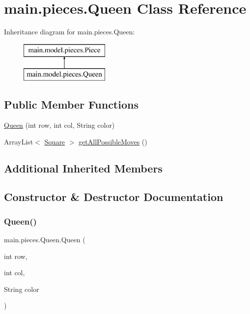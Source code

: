\hypertarget{classmain_1_1pieces_1_1_queen}{}\section{main.\+pieces.\+Queen Class Reference}
\label{classmain_1_1pieces_1_1_queen}
Inheritance diagram for main.\+pieces.\+Queen\+:\begin{figure}[H]
\begin{center}
\leavevmode
\includegraphics[height=2.000000cm]{classmain_1_1pieces_1_1_queen}
\end{center}
\end{figure}
\subsection*{Public Member Functions}
\begin{DoxyCompactItemize}
\item 
\hyperlink{classmain_1_1pieces_1_1_queen_a69aff226c807eec96b59970a1ef4b8ba}{Queen} (int row, int col, String color)
\item 
Array\+List$<$ \hyperlink{classmain_1_1_square}{Square} $>$ \hyperlink{classmain_1_1pieces_1_1_queen_ab262350e8d1ea40a4b3191724790051b}{get\+All\+Possible\+Moves} ()
\end{DoxyCompactItemize}
\subsection*{Additional Inherited Members}


\subsection{Constructor \& Destructor Documentation}
\mbox{\label{classmain_1_1pieces_1_1_queen_a69aff226c807eec96b59970a1ef4b8ba}} 
\subsubsection{\texorpdfstring{Queen()}{Queen()}}
{\footnotesize\ttfamily main.\+pieces.\+Queen.\+Queen (\begin{DoxyParamCaption}\item[{int}]{row,  }\item[{int}]{col,  }\item[{String}]{color }\end{DoxyParamCaption})\hspace{0.3cm}{\ttfamily [inline]}}

